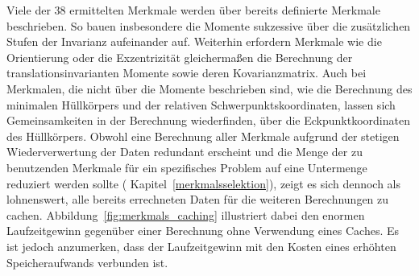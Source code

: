 

Viele der $38$ ermittelten Merkmale werden über bereits definierte Merkmale beschrieben.
So bauen insbesondere die Momente sukzessive über die zusätzlichen Stufen der Invarianz aufeinander auf.
Weiterhin erfordern Merkmale wie die Orientierung oder die Exzentrizität gleichermaßen die Berechnung der translationsinvarianten Momente sowie deren Kovarianzmatrix.
Auch bei Merkmalen, die nicht über die Momente beschrieben sind, wie \zB{} die Berechnung des minimalen Hüllkörpers und der relativen Schwerpunktskoordinaten, lassen sich Gemeinsamkeiten in der Berechnung wiederfinden, \zB{} über die Eckpunktkoordinaten des Hüllkörpers.
Obwohl eine Berechnung aller Merkmale aufgrund der stetigen Wiederverwertung der Daten redundant erscheint und die Menge der zu benutzenden Merkmale für ein spezifisches Problem auf eine Untermenge reduziert werden sollte (\vgl{} Kapitel~\ref{merkmalsselektion}), zeigt es sich dennoch als lohnenswert, alle bereits errechneten Daten für die weiteren Berechnungen zu cachen.
Abbildung~\ref{fig:merkmals_caching} illustriert dabei den enormen Laufzeitgewinn gegenüber einer Berechnung ohne Verwendung eines Caches.
Es ist jedoch anzumerken, dass der Laufzeitgewinn mit den Kosten eines erhöhten Speicheraufwands verbunden ist.
